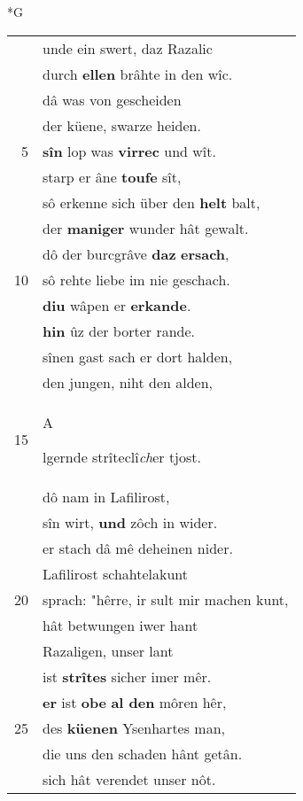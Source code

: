 \documentclass[8pt,a4paper,notitlepage]{article}
\begin{document}
\newpage
\begin{table}[ht]
\begin{minipage}[t]{0.5\linewidth}
\small
\begin{center}*G
\end{center}
\begin{tabular}{rl}
 & unde ein swert, daz Razalic\\ 
 & durch \textbf{ellen} brâhte in den wîc.\\ 
 & dâ was von gescheiden\\ 
 & der küene, swarze heiden.\\ 
5 & \textbf{sîn} lop was \textbf{virrec} und wît.\\ 
 & starp er âne \textbf{toufe} sît,\\ 
 & sô erkenne sich über den \textbf{helt} balt,\\ 
 & der \textbf{maniger} wunder hât gewalt.\\ 
 & dô der burcgrâve \textbf{daz} \textbf{ersach},\\ 
10 & sô rehte liebe im nie geschach.\\ 
 & \textbf{diu} wâpen er \textbf{erkande}.\\ 
 & \textbf{hin} ûz der borter rande.\\ 
 & sînen gast sach er dort halden,\\ 
 & den jungen, niht den alden,\\ 
15 & \begin{large}A\end{large}lgernde strîteclî\textit{ch}er tjost.\\ 
 & dô nam in Lafilirost,\\ 
 & sîn wirt, \textbf{und} zôch in wider.\\ 
 & er stach dâ mê deheinen nider.\\ 
 & Lafilirost schahtelakunt\\ 
20 & sprach: "hêrre, ir sult mir machen kunt,\\ 
 & hât betwungen iwer hant\\ 
 & Razaligen, unser lant\\ 
 & ist \textbf{strîtes} sicher imer mêr.\\ 
 & \textbf{er} ist \textbf{obe} \textbf{al den} môren hêr,\\ 
25 & des \textbf{küenen} Ysenhartes man,\\ 
 & die uns den schaden hânt getân.\\ 
 & sich hât verendet unser nôt.\\ 

\end{tabular}
\end{minipage}
\end{table}
\end{document}

